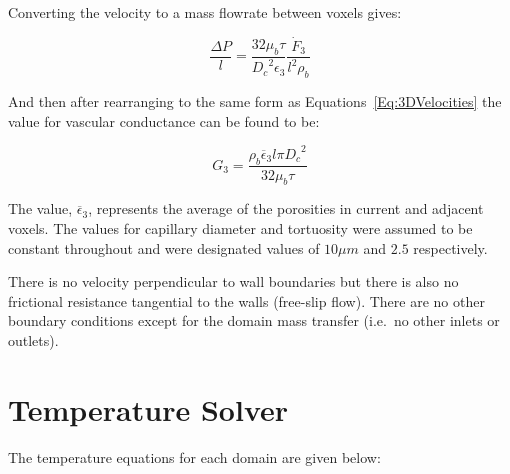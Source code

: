 \documentclass[11pt,english,a4paper,twoside,openright]{report}
\begin{document}
{{{{{{{{Converting the velocity to a mass flowrate between voxels gives:

\begin{equation}
\frac{\Delta P}{l} = \frac{32\mu_{b}\tau}{{D_{c}}^{2}\epsilon_{3}}\frac{\dot{F}_{3}}{l^{2}\rho_{b}}
\end{equation}

And then after rearranging to the same form as Equations~\ref{Eq:3DVelocities} the value for vascular conductance can be found to be:

\begin{equation}
\label{Eq:3DConductance}
G_{3} = \frac{\rho_{b}\overline{\epsilon}_{3}l\pi {D_{c}}^{2}}{32\mu_{b}\tau}
\end{equation}

The value, $\overline{\epsilon}_{3}$, represents the average of the porosities in current and adjacent voxels. The values for capillary diameter and tortuosity were assumed to be constant throughout and were designated values of $10\mu m$ and $2.5$ respectively.

There is no velocity perpendicular to wall boundaries but there is also no frictional resistance tangential to the walls (free-slip flow). There are no other boundary conditions except for the domain mass transfer (i.e.\ no other inlets or outlets). 

\section[Temperature Solver]{{\Large T}emperature {\Large S}olver}
\label{Sec:3TemperatureSolver}
The temperature equations for each domain are given below:

}}}}}}}}
\end{document}
